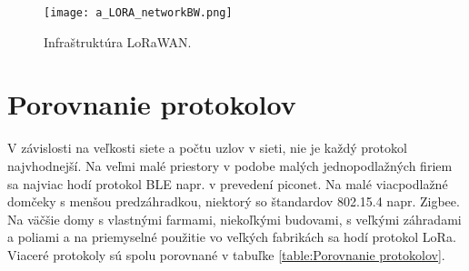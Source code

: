 \documentclass[12pt,a4wide,oneside,openright]{report}
\begin{document}
\begin{figure*}[!htb]
	\centering
	\texttt{[image: a\_LORA\_networkBW.png]}
	\caption{Infraštruktúra LoRaWAN\cite{LoRa}.}
	\label{f:a_LoRa_Architecture}
\end{figure*}

\section{Porovnanie protokolov}
V závislosti na veľkosti siete a počtu uzlov v sieti, nie je každý protokol najvhodnejší. Na veľmi malé priestory v podobe malých jednopodlažných firiem sa najviac hodí protokol BLE napr. v prevedení piconet.
Na malé viacpodlažné domčeky s menšou predzáhradkou, niektorý so štandardov 802.15.4 napr. Zigbee.
Na väčšie domy s vlastnými farmami, niekoľkými budovami, s veľkými záhradami a poliami a na priemyselné použitie vo veľkých fabrikách sa hodí protokol LoRa.
Viaceré protokoly sú spolu porovnané v tabuľke \ref{table:Porovnanie protokolov}.

\begin{table}[H]
	\centering
	\caption{Porovnanie jednotlivých parametrov vybraných protokolov.}
	\label{table:Porovnanie protokolov}
\end{table}
\end{document}
